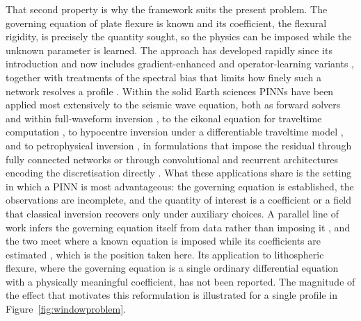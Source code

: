 \documentclass[final]{agujournal2019}
\begin{document}
That second property is why the framework suits the present problem. The
governing equation of plate flexure is known and its coefficient, the flexural
rigidity, is precisely the quantity sought, so the physics can be imposed while
the unknown parameter is learned. The approach has developed rapidly since its
introduction and now includes gradient-enhanced and operator-learning variants
\cite{Wang2025gIBPINN,Yang2026DeepONet}, together with treatments of the
spectral bias that limits how finely such a network resolves a profile
\cite{WangWangPerdikaris2021}. Within the solid Earth sciences PINNs have been
applied most extensively to the seismic wave equation, both as forward solvers
and within full-waveform inversion
\cite{RashtBehesht2022,SongAlkhalifah2021,ZhangZhuGao2023,Schuster2024}, to the
eikonal equation for traveltime computation \cite{Waheed2021PINNeik}, to
hypocentre inversion under a differentiable traveltime model
\cite{Smith2022HypoSVI}, and to petrophysical inversion
\cite{Li2024Probabilistic,Li2024Bayesian}, in formulations that impose the
residual through fully connected networks or through convolutional and recurrent
architectures encoding the discretisation directly
\cite{Gao2021PhyGeoNet,Ren2022PhyCRNet,Ren2024SeismicNet,Ding2023Topography,Ding2023HalfSpace,Hughes2019}.
What these applications share is the setting in which a PINN is most
advantageous: the governing equation is established, the observations are
incomplete, and the quantity of interest is a coefficient or a field that
classical inversion recovers only under auxiliary choices.
A parallel line of work infers the governing equation itself from data rather
than imposing it \cite{BongardLipson2007,SchmidtLipson2009,Brunton2016,Rudy2017,CampsValls2023,YuWang2024},
and the two meet where a known equation is imposed while its coefficients are
estimated \cite{Chen2021Scarce,Rao2023}, which is the position taken here. Its application to
lithospheric flexure, where the governing equation is a single ordinary
differential equation with a physically meaningful coefficient, has not been
reported. The magnitude of the effect that motivates this reformulation is
illustrated for a single profile in Figure~\ref{fig:windowproblem}.
\end{document}
